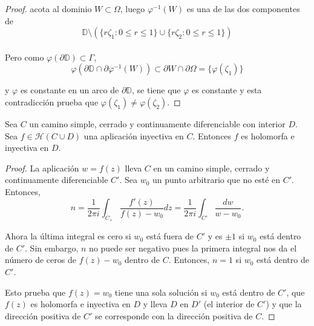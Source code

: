 \begin{proof}
    acota al dominio $W \subset \Omega$, luego $\varphi ^{-1} (W)$ es una de las dos componentes de
    \begin{equation*}
        \mathbb{D} \setminus ( \{ r \zeta_1 : 0 \leq r \leq 1\} \cup \{ r \zeta_2 : 0 \leq r \leq 1\})
    \end{equation*}
    \\
    Pero como $\varphi(\partial \mathbb{D}) \subset \Gamma$,
    \begin{equation*}
        \varphi(\partial \mathbb{D} \cap \partial \varphi ^{-1} (W)) \subset \partial W \cap \partial \Omega = \{ \varphi (\zeta_1)\}
    \end{equation*}

    y $\varphi$ es constante en un arco de $\partial \mathbb{D}$, se tiene que $\varphi$ es constante y esta contradicción prueba que $\varphi(\zeta_1) \not = \varphi(\zeta_2)$.
\end{proof}

\begin{theorem}
    Sea $C$ un camino simple, cerrado y continuamente diferenciable con interior $D$. Sea $f \in \mathcal{H}(C \cup D)$ una aplicación inyectiva en $C$. Entonces $f$ es holomorfa e inyectiva en $D$. 
\end{theorem}

\begin{proof}
    La aplicación $w = f(z)$ lleva $C$ en un camino simple, cerrado y continuamente diferenciable $C'$. Sea $w_0$ un punto arbitrario que no esté en $C'$. Entonces,
    \begin{equation*}
        n = \dfrac{1}{2 \pi i} \int_{C_+} \dfrac{f'(z)}{f(z) - w_0} dz =  \dfrac{1}{2 \pi i} \int_{C'} \dfrac{dw}{w - w_0}.
    \end{equation*}

    Ahora la última integral es cero si $w_0$ está fuera de $C'$ y es $\pm 1$ si $w_0$ está dentro de $C'$. Sin embargo, $n$ no puede ser negativo pues la primera integral nos da el número de ceros de $f(z) - w_0$ dentro de $C$. Entonces, $n=1$ si $w_0$ está dentro de $C'$.

    Esto prueba que $f(z) = w_0$ tiene una sola solución si $w_0$ está dentro de $C'$, que $f(z)$ es holomorfa e inyectiva en $D$ y lleva $D$ en $D'$ (el interior de $C'$) y que la dirección positiva de $C'$ se corresponde con la dirección positiva de $C$.
\end{proof}

